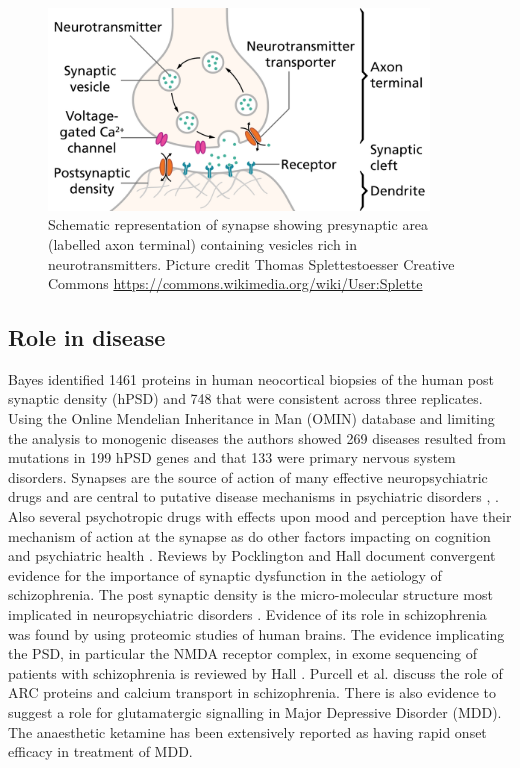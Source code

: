 \begin{figure}
    \centering
    \includegraphics[width=0.9\textwidth]{images/SynapseSchematic_en.png}
    \caption{Schematic representation of synapse showing presynaptic area (labelled axon terminal) containing vesicles rich in neurotransmitters. Picture credit Thomas Splettestoesser Creative Commons \url{https://commons.wikimedia.org/wiki/User:Splette}}
    \label{fig:synapse}
\end{figure}



\subsection{Role in disease}
 

Bayes \cite{bayes2011characterization} identified 1461 proteins in human neocortical biopsies of the human post synaptic density (hPSD) and 748 that were consistent across three replicates. Using the Online Mendelian Inheritance in Man (OMIN) database \cite{hamosh2005online} and limiting the analysis to monogenic diseases the authors showed 269 diseases resulted from mutations in 199 hPSD genes and that 133 were primary nervous system disorders. Synapses are the source of action of many effective neuropsychiatric drugs and are central to putative disease mechanisms in psychiatric disorders \cite{thompson2015excitatory}, \cite{hu2015glutamate}. Also several psychotropic drugs with effects upon mood and perception have their mechanism of action at the synapse \cite{korpi2015mechanisms} as do other factors impacting on cognition and psychiatric health \cite{bocarsly2015obesity}. Reviews by Pocklington \cite{pocklington2014synapse} and Hall \cite{hall2015genetic} document convergent evidence for the importance of synaptic dysfunction in the aetiology of schizophrenia. 
The post synaptic density is the micro-molecular structure most implicated in neuropsychiatric disorders \cite{grant2012synaptopathies}. Evidence of its role in schizophrenia was found by\cite{focking2015proteomic} using proteomic studies of human brains. The evidence implicating the PSD, in particular the NMDA receptor complex, in exome sequencing of patients with schizophrenia is reviewed by Hall \cite{hall2015genetic}. Purcell et al. \cite{purcell2014polygenic} discuss the role of ARC proteins and calcium transport in schizophrenia. 
There is also evidence to suggest a role for glutamatergic signalling in Major Depressive Disorder (MDD).\cite{murrough2017targeting} \cite{de2017genetic}The anaesthetic ketamine has been extensively reported as having rapid onset efficacy in treatment of MDD. 

